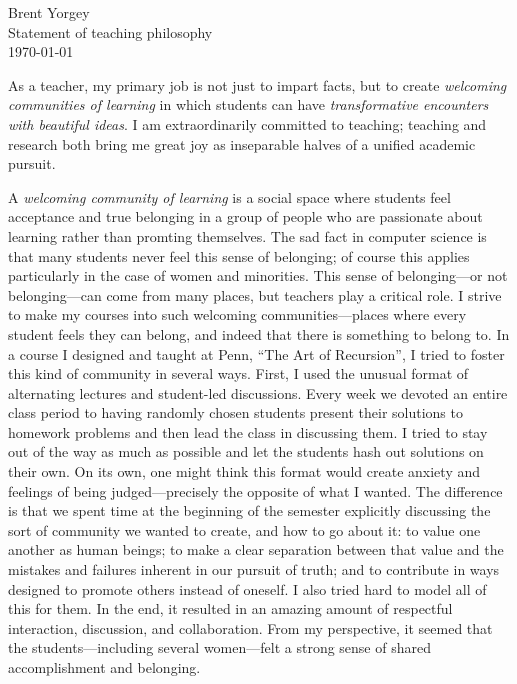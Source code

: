 \documentclass{article}
\begin{document}
\noindent Brent Yorgey \\
Statement of teaching philosophy \\
\today
\bigskip

As a teacher, my primary job is not just to impart facts, but to create
\emph{welcoming communities of learning} in which students can have
\emph{transformative encounters with beautiful ideas}.  I am
extraordinarily committed to teaching; teaching and research both
bring me great joy as inseparable halves of a unified academic
pursuit.

A \emph{welcoming community of learning} is a social space where
students feel acceptance and true belonging in a group of people who
are passionate about learning rather than promting themselves.  The
sad fact in computer science is that many students never feel this
sense of belonging; of course this applies particularly in the case of
women and minorities. This sense of belonging---or not belonging---can
come from many places, but teachers play a critical role.  I strive to
make my courses into such welcoming communities---places where every
student feels they can belong, and indeed that there is something to
belong to.  In a course I designed and taught at Penn, ``The Art of
Recursion'', I tried to foster this kind of community in several ways.
First, I used the unusual format of alternating lectures and
student-led discussions. Every week we devoted an entire class period
to having randomly chosen students present their solutions to homework
problems and then lead the class in discussing them.  I tried to stay
out of the way as much as possible and let the students hash out
solutions on their own.  On its own, one might think this format would
create anxiety and feelings of being judged---precisely the opposite
of what I wanted.  The difference is that we spent time at the
beginning of the semester explicitly discussing the sort of community
we wanted to create, and how to go about it: to value one another as
human beings; to make a clear separation between that value and the
mistakes and failures inherent in our pursuit of truth; and to
contribute in ways designed to promote others instead of oneself. I
also tried hard to model all of this for them. In the end, it resulted
in an amazing amount of respectful interaction, discussion, and
collaboration. From my perspective, it seemed that the
students---including several women---felt a strong sense of shared
accomplishment and belonging.

\end{document}
